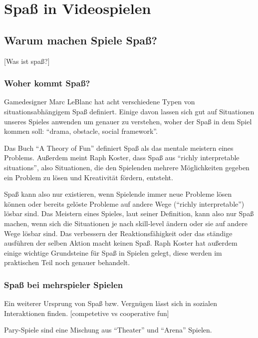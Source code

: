\chapter{Spaß in Videospielen}

\section{Warum machen Spiele Spaß?}

[Was ist spaß?]

\subsection{Woher kommt Spaß?}

Gamedesigner Marc LeBlanc hat acht verschiedene Typen von situationsabhängigem Spaß definiert. Einige davon lassen sich gut auf Situationen unseres Spieles anwenden um genauer zu verstehen, woher der Spaß in dem Spiel kommen soll: "`drama, obstacle, social framework"'. 

Das Buch "`A Theory of Fun"'\cite{_theory_of_fun} definiert Spaß als das mentale meistern eines Problems\cite[S. 71]{_theory_of_fun}. Außerdem meint Raph Koster, dass Spaß aus "`richly interpretable situations"'\cite[S. 40]{_theory_of_fun}, also Situationen, die den Spielenden mehrere Möglichkeiten gegeben ein Problem zu lösen und Kreativität fördern, entsteht. 

Spaß kann also nur existieren, wenn Spielende immer neue Probleme lösen können oder bereits gelöste Probleme auf andere Wege ("`richly interpretable"') lösbar sind. Das Meistern eines Spieles, laut seiner Definition, kann also nur Spaß machen, wenn sich die Situationen je nach skill-level ändern oder sie auf andere Wege lösbar sind. Das verbessern der Reaktionsfähigkeit oder das ständige ausführen der selben Aktion macht keinen Spaß. Raph Koster hat außerdem einige wichtige Grundsteine für Spaß in Spielen gelegt, diese werden im praktischen Teil noch genauer behandelt.

\subsection{Spaß bei mehrspieler Spielen}

Ein weiterer Ursprung von Spaß bzw. Vergnügen lässt sich in sozialen Interaktionen finden\cite[S. 72]{_theory_of_fun}.
[competetive vs cooperative fun]

Pary-Spiele sind eine Mischung aus "`Theater"' und "`Arena"' Spielen\cite[S. 65]{_art_of_gamedesign}. 

